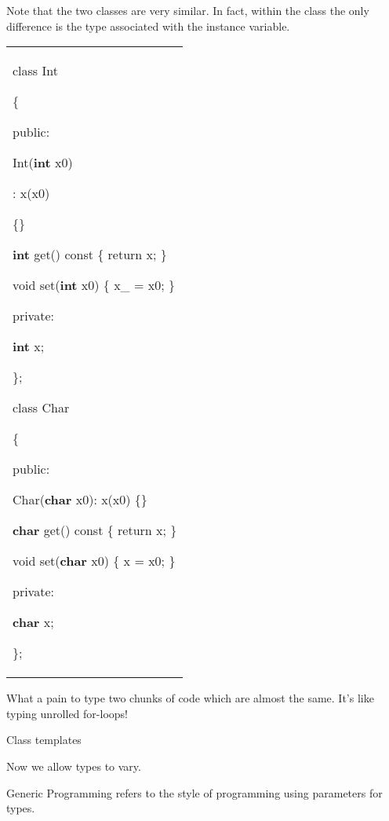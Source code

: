 \documentclass[
]{article}
\begin{document}
Note that the two classes are very similar. In fact, within the class
the only difference is the type associated with the instance variable.

\begin{longtable}[]{@{}
  >{\raggedright\arraybackslash}p{}@{}}
\toprule\noalign{}
 \\
\midrule\noalign{}
\endhead
\bottomrule\noalign{}
\endlastfoot
class Int

\{

public:

Int(\textbf{int} x0)

: x(x0)

\{\}

\textbf{int} get() const \{ return x; \}

void set(\textbf{int} x0) \{ x\_ = x0; \}

private:

\textbf{int} x;

\};

class Char

\{

public:

Char(\textbf{char} x0): x(x0) \{\}

\textbf{char} get() const \{ return x; \}

void set(\textbf{char} x0) \{ x = x0; \}

private:

\textbf{char} x;

\}; \\
\end{longtable}

What a pain to type two chunks of code which are almost the same. It's
like typing unrolled for-loops!

Class templates

Now we allow types to vary.

Generic Programming refers to the style of programming using parameters
for types.
\end{document}
